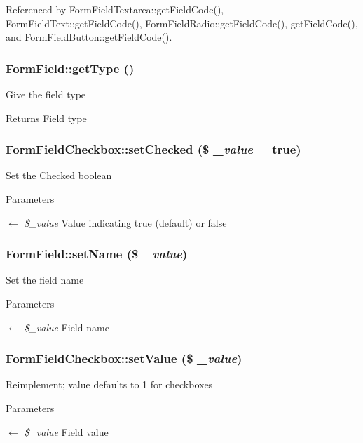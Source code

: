 Referenced by FormFieldTextarea::getFieldCode(), FormFieldText::getFieldCode(), FormFieldRadio::getFieldCode(), getFieldCode(), and FormFieldButton::getFieldCode().

\subsubsection[{getType}]{\setlength{\rightskip}{0pt plus 5cm}FormField::getType ()}\label{classFormField_a1f64b737bccb6b2827f8c5665b9920c7}
Give the field type \begin{DoxyReturn}{Returns}
Field type 
\end{DoxyReturn}
\subsubsection[{setChecked}]{\setlength{\rightskip}{0pt plus 5cm}FormFieldCheckbox::setChecked (\$ {\em \_\-value} = {\ttfamily true})}\label{classFormFieldCheckbox_a944623b7e1136bab6dd9880980037425}
Set the Checked boolean 
\begin{DoxyParams}{Parameters}
\item[\mbox{$\leftarrow$} {\em \$\_\-value}]Value indicating true (default) or false \end{DoxyParams}
\subsubsection[{setName}]{\setlength{\rightskip}{0pt plus 5cm}FormField::setName (\$ {\em \_\-value})}\label{classFormField_ad57e32bd53170af060e869b3b60f0ef7}
Set the field name 
\begin{DoxyParams}{Parameters}
\item[\mbox{$\leftarrow$} {\em \$\_\-value}]Field name \end{DoxyParams}
\subsubsection[{setValue}]{\setlength{\rightskip}{0pt plus 5cm}FormFieldCheckbox::setValue (\$ {\em \_\-value})}\label{classFormFieldCheckbox_a787abee157599c389a18e0810f69fed5}
Reimplement; value defaults to 1 for checkboxes 
\begin{DoxyParams}{Parameters}
\item[\mbox{$\leftarrow$} {\em \$\_\-value}]Field value \end{DoxyParams}


